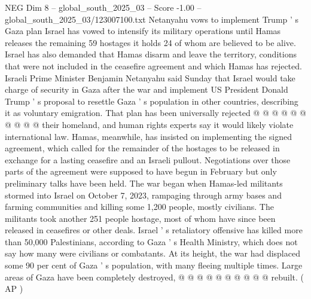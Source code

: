 \begin{textsample}{NEG Dim 8 – global\_south\_2025\_03 – Score -1.00 – global\_south\_2025\_03/123007100.txt}
Netanyahu vows to implement Trump ' s Gaza plan Israel has vowed to intensify its military operations until Hamas releases the remaining 59 hostages it holds 24 of whom are believed to be alive.
Israel has also demanded that Hamas disarm and leave the territory, conditions that were not included in the ceasefire agreement and which Hamas has rejected.
Israeli Prime Minister Benjamin Netanyahu said Sunday that Israel would take charge of security in Gaza after the war and implement US President Donald Trump ' s proposal to resettle Gaza ' s population in other countries, describing it as voluntary emigration.
That plan has been universally rejected @ @ @ @ @ @ @ @ @ @ their homeland, and human rights experts say it would likely violate international law.
Hamas, meanwhile, has insisted on implementing the signed agreement, which called for the remainder of the hostages to be released in exchange for a lasting ceasefire and an Israeli pullout.
Negotiations over those parts of the agreement were supposed to have begun in February but only preliminary talks have been held.
The war began when Hamas-led militants stormed into Israel on October 7, 2023, rampaging through army bases and farming communities and killing some 1,200 people, mostly civilians.
The militants took another 251 people hostage, most of whom have since been released in ceasefires or other deals.
Israel ' s retaliatory offensive has killed more than 50,000 Palestinians, according to Gaza ' s Health Ministry, which does not say how many were civilians or combatants.
At its height, the war had displaced some 90 per cent of Gaza ' s population, with many fleeing multiple times.
Large areas of Gaza have been completely destroyed, @ @ @ @ @ @ @ @ @ @ rebuilt. ( AP )

\end{textsample}
